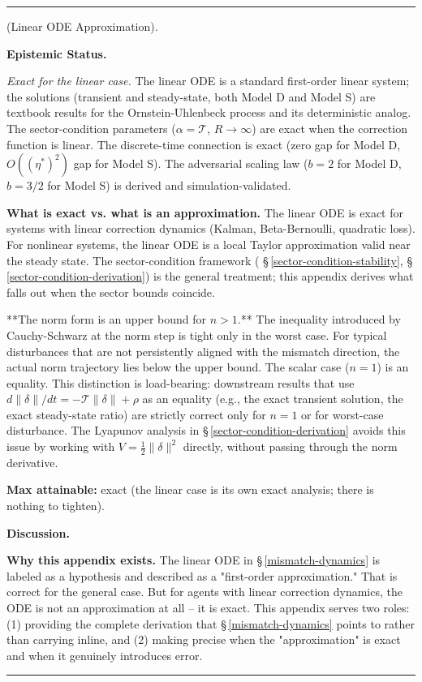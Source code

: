 \documentclass[11pt,oneside]{article}
\newcounter{claim}[section]
\renewcommand{\theclaim}{\thesection.\arabic{claim}}
\newenvironment{segment}[2]{%
  \refstepcounter{claim}%
  \bigskip\noindent\hrule\smallskip
  \noindent{\bfseries #1~\theclaim}\enskip(#2).\par\smallskip
  \noindent\ignorespaces
}{%
  \par\smallskip\noindent\hrule\bigskip
}
\newenvironment{detail}[1][]{\begin{segment}{Detail}{#1}}{\end{segment}}
\begin{document}
\begin{detail}[Linear ODE Approximation]
\medskip\noindent\textbf{Epistemic Status.}


\textit{Exact for the linear case.} The linear ODE is a standard first-order linear system; the solutions (transient and steady-state, both Model D and Model S) are textbook results for the Ornstein-Uhlenbeck process and its deterministic analog. The sector-condition parameters ($\alpha = \mathcal{T}$, $R \to \infty$) are exact when the correction function is linear. The discrete-time connection is exact (zero gap for Model D, $O((\eta^*)^2)$ gap for Model S). The adversarial scaling law ($b = 2$ for Model D, $b = 3/2$ for Model S) is derived and simulation-validated.

\textbf{What is exact vs. what is an approximation.} The linear ODE is exact for systems with linear correction dynamics (Kalman, Beta-Bernoulli, quadratic loss). For nonlinear systems, the linear ODE is a local Taylor approximation valid near the steady state. The sector-condition framework ( \S\,\ref{sector-condition-stability}, \S\,\ref{sector-condition-derivation}) is the general treatment; this appendix derives what falls out when the sector bounds coincide.

**The norm form is an upper bound for $n > 1$.** The inequality introduced by Cauchy-Schwarz at the norm step is tight only in the worst case. For typical disturbances that are not persistently aligned with the mismatch direction, the actual norm trajectory lies below the upper bound. The scalar case ($n = 1$) is an equality. This distinction is load-bearing: downstream results that use $d\lVert\delta\rVert/dt = -\mathcal{T}\lVert\delta\rVert + \rho$ as an equality (e.g., the exact transient solution, the exact steady-state ratio) are strictly correct only for $n = 1$ or for worst-case disturbance. The Lyapunov analysis in \S\,\ref{sector-condition-derivation} avoids this issue by working with $V = \frac{1}{2}\lVert\delta\rVert^2$ directly, without passing through the norm derivative.

\textbf{Max attainable:} exact (the linear case is its own exact analysis; there is nothing to tighten).


\medskip\noindent\textbf{Discussion.}


\textbf{Why this appendix exists.} The linear ODE in \S\,\ref{mismatch-dynamics} is labeled as a hypothesis and described as a "first-order approximation." That is correct for the general case. But for agents with linear correction dynamics, the ODE is not an approximation at all -- it is exact. This appendix serves two roles: (1) providing the complete derivation that \S\,\ref{mismatch-dynamics} points to rather than carrying inline, and (2) making precise when the "approximation" is exact and when it genuinely introduces error.


\end{detail}
\end{document}
